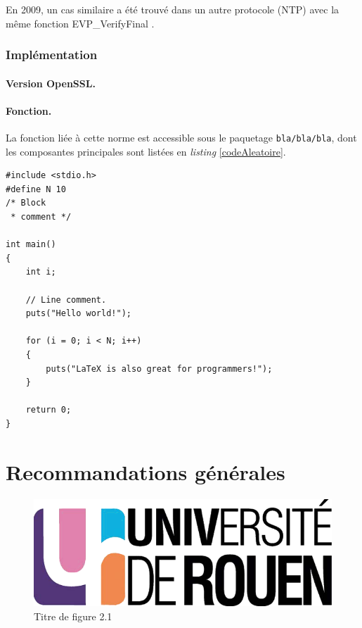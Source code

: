		En 2009, un cas similaire a été trouvé dans un autre protocole 
		(NTP) avec la même fonction EVP\_VerifyFinal \cite{cve-2009-0021}.
		
		\subsubsection{Implémentation}
			
			\paragraph{Version OpenSSL.\\}
			
			\paragraph{Fonction.\\}
			La fonction liée à cette norme est accessible sous le paquetage
			\texttt{bla/bla/bla}, dont les composantes principales sont 
			listées en \textit{listing} \ref{codeAleatoire}.
		
		
		\begin{lstlisting}[style=customc,caption=codeAleatoire.c, label=codeAleatoire]
#include <stdio.h>
#define N 10
/* Block
 * comment */
 
int main()
{
    int i;
 
    // Line comment.
    puts("Hello world!");
 
    for (i = 0; i < N; i++)
    {
        puts("LaTeX is also great for programmers!");
    }
 
    return 0;
}
		\end{lstlisting}
		
		
		
		
		
	

\section{Recommandations générales}




\begin{figure}[H]
	\centering
	\includegraphics[scale=0.2]{images/logo_univ.png}
	\caption{Titre de figure 2.1}
	\label{fig21}
\end{figure}